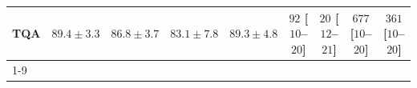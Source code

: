 \begin{tabular}{l|cccc|cccc|}
TQA & {\cellcolor[HTML]{04639B}} \color[HTML]{F1F1F1} $89.4\pm 3.3$ & {\cellcolor[HTML]{056DAC}} \color[HTML]{F1F1F1} $86.8\pm 3.7$ & {\cellcolor[HTML]{2081B9}} \color[HTML]{F1F1F1} $83.1\pm 7.8$ & {\cellcolor[HTML]{04639B}} \color[HTML]{F1F1F1} $89.3\pm 4.8$ & {\cellcolor[HTML]{FDE2DF}} \color[HTML]{000000} $92$ [$10$--$20$] & {\cellcolor[HTML]{FFF3EF}} \color[HTML]{000000} $20$ [$12$--$21$] & {\cellcolor[HTML]{7C0177}} \color[HTML]{F1F1F1} $677$ [$10$--$20$] & {\cellcolor[HTML]{F878A7}} \color[HTML]{F1F1F1} $361$ [$10$--$20$] \\
\cline{1-9}
\bottomrule
\end{tabular}
